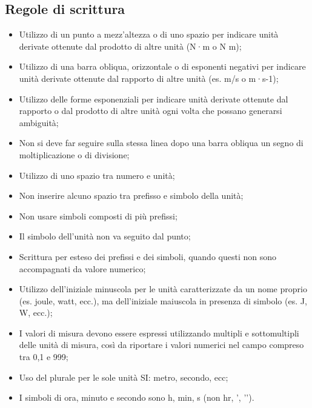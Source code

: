 \documentclass[a4paper, 15pt]{article}
\begin{document}
\newpage
\subsection{Regole di scrittura} 
\begin{adjustwidth}{2in}{}
	\begin{itemize}
		\item Utilizzo di un punto a mezz'altezza o di uno spazio per indicare unità derivate
		ottenute dal prodotto di altre unità (N·m o N m);
		\item Utilizzo di una barra obliqua, orizzontale o di esponenti negativi per indicare
		unità derivate ottenute dal rapporto di altre unità (es. m/s o m·s-1);
		\item Utilizzo delle forme esponenziali per indicare unità derivate ottenute dal
		rapporto o dal prodotto di altre unità ogni volta che possano generarsi
		ambiguità;
		\item Non si deve far seguire sulla stessa linea dopo una barra obliqua un segno di
		moltiplicazione o di divisione;
		\item Utilizzo di uno spazio tra numero e unità;
		\item Non inserire alcuno spazio tra prefisso e simbolo della unità;
		\item Non usare simboli composti di più prefissi;
		\item Il simbolo dell’unità non va seguito dal punto;
		\item Scrittura per esteso dei prefissi e dei simboli, quando questi non sono
		accompagnati da valore numerico;
		\item Utilizzo dell'iniziale minuscola per le unità caratterizzate da un nome proprio
		(es. joule, watt, ecc.), ma dell'iniziale maiuscola in presenza di simbolo (es. J,
		W, ecc.);
		\item I valori di misura devono essere espressi utilizzando multipli e sottomultipli
		delle unità di misura, così da riportare i valori numerici nel campo compreso
		tra 0,1 e 999;
		\item Uso del plurale per le sole unità SI: metro, secondo, ecc;
		\item I simboli di ora, minuto e secondo sono h, min, s (non hr, ’, ’’).
	\end{itemize}
\end{adjustwidth}
\end{document}
